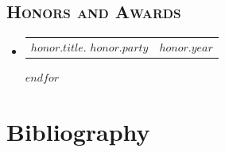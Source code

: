 \documentclass[12pt, letterpaper]{article}
\makeatletter
\newcommand{\headerrow}[2]
{\begin{tabular*}{\linewidth}{l@{\extracolsep{\fill}}r}
	#1 &
	#2 \\
\end{tabular*}}
\makeatother
\begin{document}
\subsection*{\textsc{Honors and Awards}}
\begin{itemize}
    \parskip=0.1em
    
    $for(honor)$
    \item
    \headerrow
    {\textbf{$honor.title$}. $honor.party$}
    {\emph{$honor.year$}}
    $endfor$
\end{itemize}

\newpage
\onehalfspacing
%
\nocite{*}
%
\section*{Bibliography}
\printbibliography[heading=subbibintoc, keyword=peer, title={Peer-reviewed}]
\printbibliography[heading=subbibintoc, keyword=conference, title={Conference}]
\end{document}
